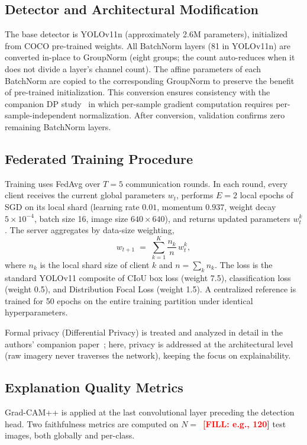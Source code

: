 \documentclass[a4paper,10pt]{article}
\newcommand{\tbd}[1]{\textcolor{red}{\textbf{[FILL: #1]}}}
\begin{document}
\subsection{Detector and Architectural Modification}
The base detector is YOLOv11n (approximately 2.6M parameters), initialized
from COCO pre-trained weights. All BatchNorm layers (81 in YOLOv11n) are
converted in-place to GroupNorm (eight groups; the count auto-reduces when it
does not divide a layer's channel count). The affine parameters of each
BatchNorm are copied to the corresponding GroupNorm to preserve the benefit
of pre-trained initialization. This conversion ensures consistency with the
companion DP study~\cite{paperA} in which per-sample gradient computation
requires per-sample-independent normalization. After conversion, validation
confirms zero remaining BatchNorm layers.

\subsection{Federated Training Procedure}
Training uses FedAvg over $T = 5$ communication rounds. In each round, every
client receives the current global parameters $w_t$, performs $E = 2$ local
epochs of SGD on its local shard (learning rate $0.01$, momentum $0.937$,
weight decay $5 \times 10^{-4}$, batch size 16, image size $640 \times 640$),
and returns updated parameters $w_t^k$. The server aggregates by data-size
weighting,
\begin{equation}
w_{t+1} \;=\; \sum_{k=1}^{K} \frac{n_k}{n}\, w_t^k,
\label{eq:fedavg}
\end{equation}
where $n_k$ is the local shard size of client $k$ and $n = \sum_k n_k$. The
loss is the standard YOLOv11 composite of CIoU box loss (weight 7.5),
classification loss (weight 0.5), and Distribution Focal Loss (weight 1.5).
A centralized reference is trained for 50 epochs on the entire training
partition under identical hyperparameters.

Formal privacy (Differential Privacy) is treated and analyzed in detail in
the authors' companion paper~\cite{paperA}; here, privacy is addressed at the
architectural level (raw imagery never traverses the network), keeping the
focus on explainability.

\subsection{Explanation Quality Metrics}
Grad-CAM++ is applied at the last convolutional layer preceding the detection
head. Two faithfulness metrics are computed on $N = $~\tbd{e.g., 120} test
images, both globally and per-class.
\end{document}
